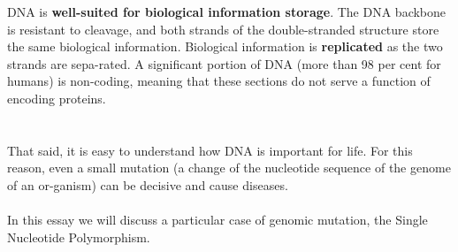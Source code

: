 DNA is \textbf{well-suited for biological information storage}. The DNA backbone is resistant to cleavage, and both strands of the double-stranded structure store the same biological information. Biological information is \textbf{replicated} as the two strands are sepa-rated. A significant portion of DNA (more than 98 per cent for humans) is non-coding, meaning that these sections do not serve a function of encoding proteins.
\\
\\
\\That said, it is easy to understand how DNA is important for life. For this reason, even a small mutation (a change of the nucleotide sequence of the genome of an or-ganism) can be decisive and cause diseases.
\\
\\In this essay we will discuss a particular case of genomic mutation, the Single Nucleotide Polymorphism.